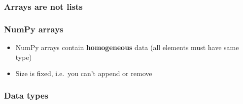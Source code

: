 \documentclass[12pt,letterpaper,twoside]{article}
\begin{document}
\begin{python}
\begin{Highlighting}[]
\NormalTok{a[}\NormalTok{]}
\end{Highlighting}
\end{python}

\begin{python}
\begin{Highlighting}[]
\NormalTok{a[}\NormalTok{] }\OperatorTok{=} 
\end{Highlighting}
\end{python}

\hypertarget{arrays-are-not-lists}{%
\subsubsection{Arrays are not lists}\label{arrays-are-not-lists}}

\begin{python}
\begin{Highlighting}[]
\NormalTok{a[}\NormalTok{] }\OperatorTok{=} 
\end{Highlighting}
\end{python}

\begin{python}
\begin{Highlighting}[]
\NormalTok{)}
\end{Highlighting}
\end{python}

\hypertarget{numpy-arrays}{%
\subsubsection{NumPy arrays}\label{numpy-arrays}}

\begin{itemize}
\item
  NumPy arrays contain \textbf{homogeneous} data (all elements must have
  same type)
\item
  Size is fixed, i.e.~you can't append or remove
\end{itemize}

\hypertarget{data-types}{%
\subsubsection{Data types}\label{data-types}}
\end{document}
